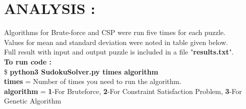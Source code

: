 \documentclass[11pt]{article}
\begin{document}
\section{ANALYSIS :}
Algorithms for Brute-force and CSP were run five times for each puzzle.\\
Values for mean and standard deviation were noted in table given below.\\
Full result with input and output puzzle is included in a file "\textbf{results.txt}".\\
\textbf{To run code :}\\
\linebreak
\$ \textbf{python3 SudokuSolver.py times algorithm}\\
\textbf{times} = Number of times you need to run the algorithm.\\
\textbf{algorithm} = \textbf{1}-For Bruteforce, \textbf{2}-For Constraint Satisfaction Problem, \textbf{3}-For Genetic Algorithm 
\end{document}
